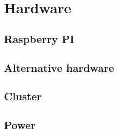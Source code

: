 


\section{Hardware}
\subsection{Raspberry PI}

\subsection{Alternative hardware}
\subsection{Cluster}
\subsection{Power}
